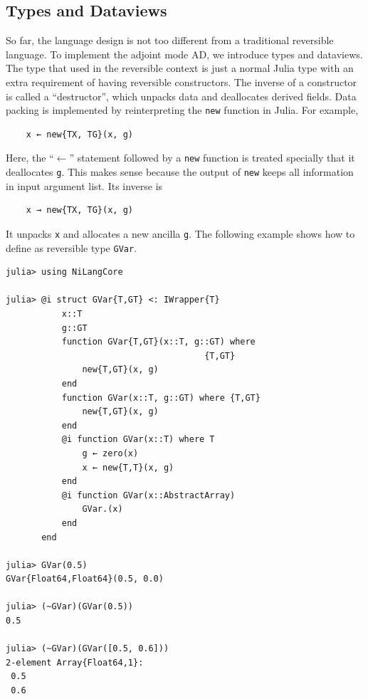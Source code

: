 \documentclass[aps,twocolumn,longbibliography,english,superscriptaddress]{revtex4-1}
\newcommand{\<}{\langle}
\renewcommand{\>}{\rangle}
\theoremstyle{definition}\newtheorem{definition}{\textit{Definition}}
\begin{document}
\subsection{Types and Dataviews}
So far, the language design is not too different from a traditional reversible language. To implement the adjoint mode AD, we introduce types and dataviews.
The type that used in the reversible context is just a normal Julia type with an extra requirement of having reversible constructors.
The inverse of a constructor is called a ``destructor'', which unpacks data and deallocates derived fields.
Data packing is implemented by reinterpreting the \texttt{new} function in Julia. For example,

\begin{minipage}{.44\textwidth}
\begin{lstlisting}
    x ← new{TX, TG}(x, g)
\end{lstlisting}
\end{minipage}

Here, the ``$\leftarrow$'' statement followed by a \texttt{new} function is treated specially that it deallocates \texttt{g}. This makes sense because the output of \texttt{new} keeps all information in input argument list.
Its inverse is

\begin{minipage}{.44\textwidth}
\begin{lstlisting}
    x → new{TX, TG}(x, g)
\end{lstlisting}
\end{minipage}

It unpacks \texttt{x} and allocates a new ancilla \texttt{g}.
The following example shows how to define as reversible type \texttt{GVar}.

\begin{minipage}{.44\textwidth}
\begin{lstlisting}
julia> using NiLangCore

julia> @i struct GVar{T,GT} <: IWrapper{T}
           x::T
           g::GT
           function GVar{T,GT}(x::T, g::GT) where
                                       {T,GT}
               new{T,GT}(x, g)
           end
           function GVar(x::T, g::GT) where {T,GT}
               new{T,GT}(x, g)
           end
           @i function GVar(x::T) where T
               g ← zero(x)
               x ← new{T,T}(x, g)
           end
           @i function GVar(x::AbstractArray)
               GVar.(x)
           end
       end

julia> GVar(0.5)
GVar{Float64,Float64}(0.5, 0.0)

julia> (~GVar)(GVar(0.5))
0.5

julia> (~GVar)(GVar([0.5, 0.6]))
2-element Array{Float64,1}:
 0.5
 0.6
\end{lstlisting}
\end{minipage}
\end{document}
